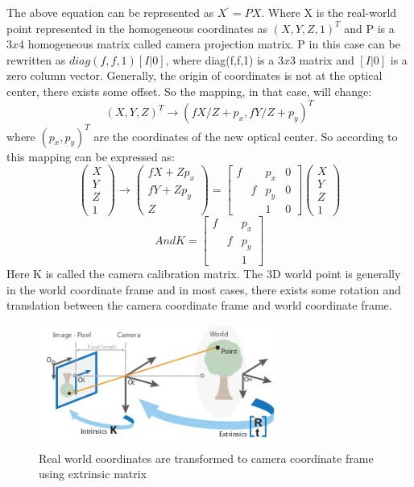     
The above equation can be represented as  $X^{‘} = PX $. Where X is the real-world point represented in the homogeneous coordinates as $(X, Y, Z, 1)^{T}$ and P is a $3x4$ homogeneous matrix called camera projection matrix. P in this case can be rewritten as $diag(f,f,1) [I|0]$, where diag(f,f,1) is a $3x3$ matrix and $[I|0]$ is a zero column vector. 
Generally, the origin of coordinates is not at the optical center, there exists some offset. So the mapping, in that case, will change: 
\begin{equation}
(X,Y,Z)^{T} \rightarrow (fX/Z + p_{x}, fY/Z + p_{y})^{T}
\end{equation}
 where $(p_{x}, p_{y})^{T}$ are the coordinates of the new optical center. So according to this mapping can be expressed as:
   \begin{equation}
\left(\begin{array}{c}X \\ Y \\ Z \\ 1 \end{array}\right) \rightarrow \left(\begin{array}{c} fX + Zp_{x} \\ fY + Zp_{y} \\ Z \end{array}\right) = \begin{bmatrix}f & &p_{x} & 0 \\  &f &p_{y} & 0  \\   & &1 & 0   \end{bmatrix}\left(\begin{array}{c}X\\ Y  \\Z \\ 1 \end{array}\right)
\end{equation}
\begin{equation}
And  K =  \begin{bmatrix}f & &p_{x} \\  &f &p_{y}  \\   & &1    \end{bmatrix}
\end{equation}
 Here K is called the camera calibration matrix. The 3D world point is generally in the world coordinate frame and in most cases, there exists some rotation and translation between the camera coordinate frame and world coordinate frame.
 
    \begin{figure}[h]
    \centering
    \includegraphics[width=8cm, height =4cm]{images/camera_geo.png}
    \caption{ Real world coordinates \cite{10.5555/861369} are transformed to camera coordinate frame using extrinsic matrix }
    \end{figure}
    
